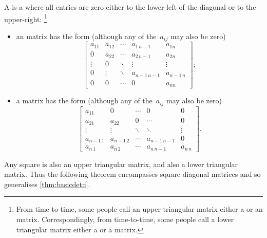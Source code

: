 \begin{definition} \label{def:trim}
A  is a  where all entries are zero either to the lower-left of the diagonal or to the upper-right:
\footnote{From time-to-time, some people call an upper triangular matrix either a  or an  matrix.  
Correspondingly, from time-to-time, some people  call a lower triangular matrix either a  or a  matrix.}
\begin{itemize}
\item an  matrix has the form (although any of the~\(a_{ij}\) may also be zero)
\begin{equation*}
\begin{bmatrix} a_{11}&a_{12}&\cdots&a_{1\,n-1}&a_{1n}
\\0&a_{22}&\cdots&a_{2\,n-1} &a_{2n}
\\\vdots&0&\ddots&\vdots&\vdots
\\0&\vdots&\ddots&a_{n-1\,n-1}&a_{n-1\,n} 
\\0&0&\cdots&0&a_{nn} \end{bmatrix};
\end{equation*}

\item a  matrix has the form (although any of the~\(a_{ij}\) may also be zero)
\begin{equation*}
\begin{bmatrix} a_{11}&0&\cdots&0&0
\\a_{21}&a_{22}&0&\cdots &0
\\\vdots&\vdots&\ddots&\ddots&\vdots
\\a_{n-1\,1}&a_{n-1\,2}&\cdots&a_{n-1\,n-1}&0 
\\a_{n\,1}&a_{n\,2}&\cdots&a_{n\,n-1}&a_{n\,n} \end{bmatrix}.
\end{equation*}
\end{itemize}
\end{definition}


Any square  is also an upper triangular matrix, and also a lower triangular matrix.
Thus the following theorem encompasses square diagonal matrices and so generalises \autoref{thm:basicdet:i}.



